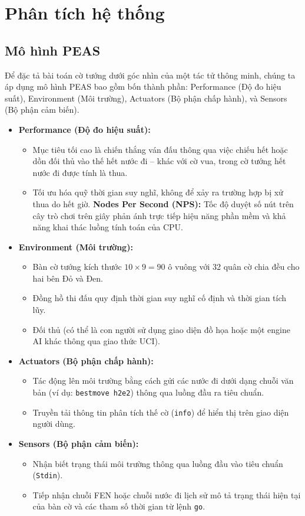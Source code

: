 \chapter{Phân tích hệ thống}

\section{Mô hình PEAS}

Để đặc tả bài toán cờ tướng dưới góc nhìn của một tác tử thông minh, chúng ta áp dụng mô hình PEAS bao gồm bốn thành phần: Performance (Độ đo hiệu suất), Environment (Môi trường), Actuators (Bộ phận chấp hành), và Sensors (Bộ phận cảm biến).

\begin{itemize}
    \item \textbf{Performance (Độ đo hiệu suất):}
    \begin{itemize}
        \item Mục tiêu tối cao là chiến thắng ván đấu thông qua việc chiếu hết hoặc dồn đối thủ vào thế hết nước đi -- khác với cờ vua, trong cờ tướng hết nước đi được tính là thua.
        \item Tối ưu hóa quỹ thời gian suy nghĩ, không để xảy ra trường hợp bị xử thua do hết giờ.
        \textbf{Nodes Per Second (NPS):} Tốc độ duyệt số nút trên cây trò chơi trên giây phản ánh trực tiếp hiệu năng phần mềm và khả năng khai thác luồng tính toán của CPU.
    \end{itemize}
    \item \textbf{Environment (Môi trường):}
    \begin{itemize}
        \item Bàn cờ tướng kích thước $10 \times 9 = 90$ ô vuông với 32 quân cờ chia đều cho hai bên Đỏ và Đen.
        \item Đồng hồ thi đấu quy định thời gian suy nghĩ cố định và thời gian tích lũy.
        \item Đối thủ (có thể là con người sử dụng giao diện đồ họa hoặc một engine AI khác thông qua giao thức UCI).
    \end{itemize}
    \item \textbf{Actuators (Bộ phận chấp hành):}
    \begin{itemize}
        \item Tác động lên môi trường bằng cách gửi các nước đi dưới dạng chuỗi văn bản (ví dụ: \texttt{bestmove h2e2}) thông qua luồng đầu ra tiêu chuẩn.
        \item Truyền tải thông tin phân tích thế cờ (\texttt{info}) để hiển thị trên giao diện người dùng.
    \end{itemize}
    \item \textbf{Sensors (Bộ phận cảm biến):}
    \begin{itemize}
        \item Nhận biết trạng thái môi trường thông qua luồng đầu vào tiêu chuẩn (\texttt{Stdin}).
        \item Tiếp nhận chuỗi FEN hoặc chuỗi nước đi lịch sử mô tả trạng thái hiện tại của bàn cờ và các tham số thời gian từ lệnh \texttt{go}.
    \end{itemize}
\end{itemize}

